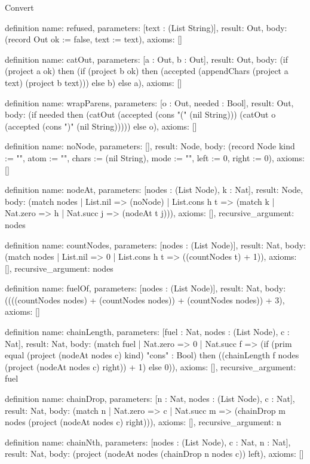 \begin{lexlean}{Convert}
\begin{semanticmodule}
definition{
  name: refused,
  parameters: [text : (List String)],
  result: Out,
  body: (record Out {ok := false, text := text}),
  axioms: []
}

definition{
  name: catOut,
  parameters: [a : Out, b : Out],
  result: Out,
  body: (if (project a ok) then (if (project b ok) then (accepted (appendChars (project a text) (project b text))) else b) else a),
  axioms: []
}

definition{
  name: wrapParens,
  parameters: [o : Out, needed : Bool],
  result: Out,
  body: (if needed then (catOut (accepted (cons "(" (nil String))) (catOut o (accepted (cons ")" (nil String))))) else o),
  axioms: []
}

definition{
  name: noNode,
  parameters: [],
  result: Node,
  body: (record Node {kind := "", atom := "", chars := (nil String), mode := "", left := 0, right := 0}),
  axioms: []
}

definition{
  name: nodeAt,
  parameters: [nodes : (List Node), k : Nat],
  result: Node,
  body: (match nodes
    | List.nil => (noNode)
    | List.cons h t => (match k
    | Nat.zero => h
    | Nat.succ j => (nodeAt t j))),
  axioms: [],
  recursive_argument: nodes
}

definition{
  name: countNodes,
  parameters: [nodes : (List Node)],
  result: Nat,
  body: (match nodes
    | List.nil => 0
    | List.cons h t => ((countNodes t) + 1)),
  axioms: [],
  recursive_argument: nodes
}

definition{
  name: fuelOf,
  parameters: [nodes : (List Node)],
  result: Nat,
  body: ((((countNodes nodes) + (countNodes nodes)) + (countNodes nodes)) + 3),
  axioms: []
}

definition{
  name: chainLength,
  parameters: [fuel : Nat, nodes : (List Node), c : Nat],
  result: Nat,
  body: (match fuel
    | Nat.zero => 0
    | Nat.succ f => (if (prim equal (project (nodeAt nodes c) kind) "cons" : Bool) then ((chainLength f nodes (project (nodeAt nodes c) right)) + 1) else 0)),
  axioms: [],
  recursive_argument: fuel
}

definition{
  name: chainDrop,
  parameters: [n : Nat, nodes : (List Node), c : Nat],
  result: Nat,
  body: (match n
    | Nat.zero => c
    | Nat.succ m => (chainDrop m nodes (project (nodeAt nodes c) right))),
  axioms: [],
  recursive_argument: n
}

definition{
  name: chainNth,
  parameters: [nodes : (List Node), c : Nat, n : Nat],
  result: Nat,
  body: (project (nodeAt nodes (chainDrop n nodes c)) left),
  axioms: []
}


\end{semanticmodule}
\end{lexlean}

